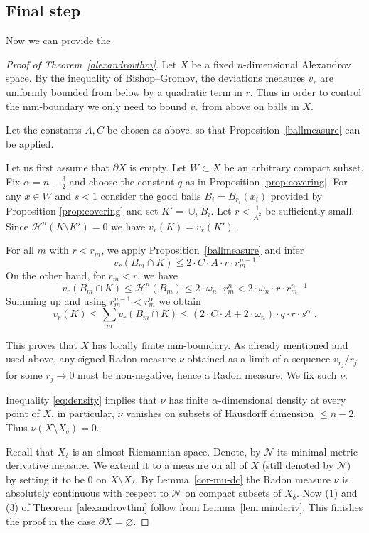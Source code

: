 \documentclass[12pt,leqno,intlimits]{amsart}
\numberwithin{equation}{section}
\theoremstyle{definition}
\theoremstyle{remark}
\newcommand{\tref}[1]{Theorem~\ref{#1}}
\newcommand{\pref}[1]{Proposition~\ref{#1}}
\newcommand{\lref}[1]{Lemma~\ref{#1}}
\def\emptyset{\varnothing}
\begin{document}
\subsection{Final step}
Now we can provide the
\begin{proof}[Proof of Theorem~\ref{alexandrovthm}]
Let $X$ be a fixed $n$-dimensional Alexandrov space.   By the inequality of Bishop--Gromov,  the deviations measures $v_r$ are uniformly bounded from below
by a quadratic term in $r$. Thus  in order to control the mm-boundary  we only need to bound $v_r$ from above on balls in $X$.

 Let the constants $A,C$ be chosen as above, so that \pref{ballmeasure} can be applied.

Let us first assume that $\partial X$  is empty.
 Let $W\subset X$ be an arbitrary  compact subset. Fix $\alpha =n-\frac 3 2$ and choose the constant $q$ as in Proposition \ref{prop:covering}.
For any $x\in W$ and $s<1$ consider the  good  balls $B_i=B_{r_i} (x_i)$ provided by Proposition \ref{prop:covering} and set $K'=\cup _i B_i$. Let $r<\frac 1 {A^2}$ be sufficiently small.  Since $\mathcal H^n (K\setminus K')=0$
we have $ v_r (K)=v_r (K')$.





For all $m$ with $r<r_m$, we apply \pref{ballmeasure} and infer
$$v_r(B_m \cap K)\le 2\cdot  C\cdot A \cdot r\cdot r_m^{n-1} $$
On the other hand, for $r_m<r$, we have
$$v_r (B_m\cap K) \leq \mathcal H^n  (B_m) \leq 2 \cdot \omega _n  \cdot r_m ^n < 2\cdot \omega_n \cdot r \cdot r_m ^{n-1} $$
Summing up  and using $r_m^{n-1} < r_m ^{\alpha}$ we obtain
\begin{equation} \label{eq:density}
v_r (K) \leq \sum_m v_r (B_m \cap K) \leq (2\cdot C\cdot A+2\cdot \omega _n) \cdot q\cdot  r \cdot s^{\alpha} \; .
\end{equation}

This proves that $X$ has locally finite mm-boundary.  As already mentioned and used above, any  signed Radon measure $\nu$ obtained as a limit of a sequence $v_{r_j} /r_j$ for some $r_j\to 0$ must be non-negative, hence a Radon measure.    We fix such $\nu$.

Inequality \eqref{eq:density} implies that $\nu$ has finite $\alpha$-dimensional density at every point of $X$, in particular, $\nu$  vanishes on subsets of Hausdorff dimension $\leq n-2$.
  Thus $\nu (X \setminus X_{\delta } )=0$.

Recall that $X_{\delta}$ is an almost Riemannian space. Denote, by $\mathcal N $ its minimal metric derivative measure. We extend it to a measure on all of $X$ (still denoted by $\mathcal N $) by setting it to be $0$ on $X\setminus X_{\delta}$.
By \lref{cor-mu-dc} the Radon measure  $\nu$  is absolutely continuous with respect to  $\mathcal N $ on compact subsets of $X_{\delta}$.
  Now (1) and (3) of \tref{alexandrovthm} follow from \lref{lem:minderiv}.
 This finishes the proof in the case $\partial X=\emptyset$.




\end{proof}
\end{document}
